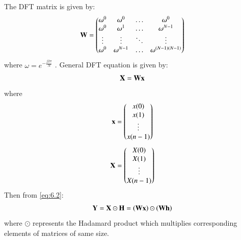 \documentclass[journal,12pt,twocolumn]{IEEEtran}
\theoremstyle{remark}
\renewcommand\thesection{\arabic{section}}
\numberwithin{equation}{subsection}
\begin{document}
\begin{enumerate}[label=\thesection.\arabic*]
\solution The DFT matrix is given by: 
\begin{align}
	\mathbf{W} = 
	\begin{pmatrix}
		\omega^0 & \omega^0 & \ldots & \omega^0 \\
		\omega^0 & \omega^1 & \ldots & \omega^{N - 1} \\
		\vdots & \vdots & \ddots & \vdots \\
		\omega^0 & \omega^{N - 1} & \ldots & \omega^{(N -1)(N - 1)}
	\end{pmatrix}
\end{align}
where $\omega=e^{-\frac{j2\pi}{N}}$ . General DFT equation is given by:
\begin{align}
    \mathbf{X} = \mathbf{W}\mathbf{x}
\end{align}
where
\begin{align}
	\mathbf{x} = 
	\begin{pmatrix}
		x(0) \\ x(1) \\ \vdots \\ x(n - 1)
	\end{pmatrix}
\end{align}
\begin{align}
	\mathbf{X} = 
	\begin{pmatrix}
		X(0) \\ X(1) \\ \vdots \\ X(n - 1)
	\end{pmatrix}
\end{align}
Then from \eqref{eq:6.2}:
\begin{align}
	\mathbf{Y} = \mathbf{X}\odot\mathbf{H} = \left(\mathbf{W}\mathbf{x}\right)\odot\left(\mathbf{W}\mathbf{h}\right)
\end{align}
where $\odot$ represents the Hadamard product which multiplies corresponding elements of matrices of same size.


\end{enumerate}
\end{document}
